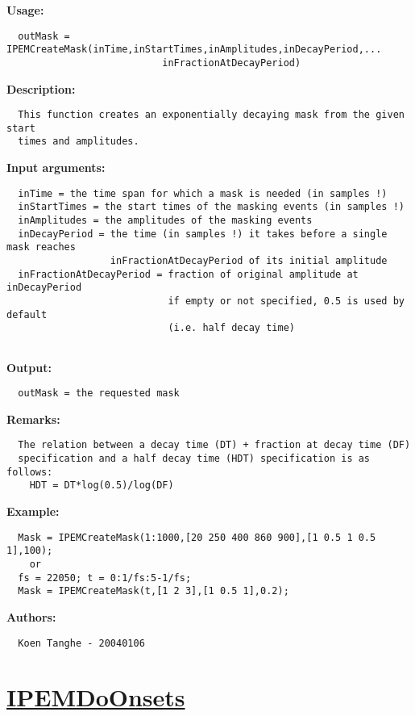 \textbf{Usage:}
\begin{verbatim}  outMask = IPEMCreateMask(inTime,inStartTimes,inAmplitudes,inDecayPeriod,...
                           inFractionAtDecayPeriod)

\end{verbatim}
\textbf{Description:}
\begin{verbatim}  This function creates an exponentially decaying mask from the given start
  times and amplitudes.

\end{verbatim}
\textbf{Input arguments:}
\begin{verbatim}  inTime = the time span for which a mask is needed (in samples !)
  inStartTimes = the start times of the masking events (in samples !)
  inAmplitudes = the amplitudes of the masking events
  inDecayPeriod = the time (in samples !) it takes before a single mask reaches
                  inFractionAtDecayPeriod of its initial amplitude
  inFractionAtDecayPeriod = fraction of original amplitude at inDecayPeriod
                            if empty or not specified, 0.5 is used by default
                            (i.e. half decay time)
 
\end{verbatim}
\textbf{Output:}
\begin{verbatim}  outMask = the requested mask

\end{verbatim}
\textbf{Remarks:}
\begin{verbatim}  The relation between a decay time (DT) + fraction at decay time (DF)
  specification and a half decay time (HDT) specification is as follows:
    HDT = DT*log(0.5)/log(DF)

\end{verbatim}
\textbf{Example:}
\begin{verbatim}  Mask = IPEMCreateMask(1:1000,[20 250 400 860 900],[1 0.5 1 0.5 1],100);
    or
  fs = 22050; t = 0:1/fs:5-1/fs;
  Mask = IPEMCreateMask(t,[1 2 3],[1 0.5 1],0.2);

\end{verbatim}
\textbf{Authors:}
\begin{verbatim}  Koen Tanghe - 20040106
\end{verbatim}


\newpage
\section*{\hyperlink{Concepts:IPEMDoOnsets}{IPEMDoOnsets}}
\hypertarget{FuncRef:IPEMDoOnsets}{}


